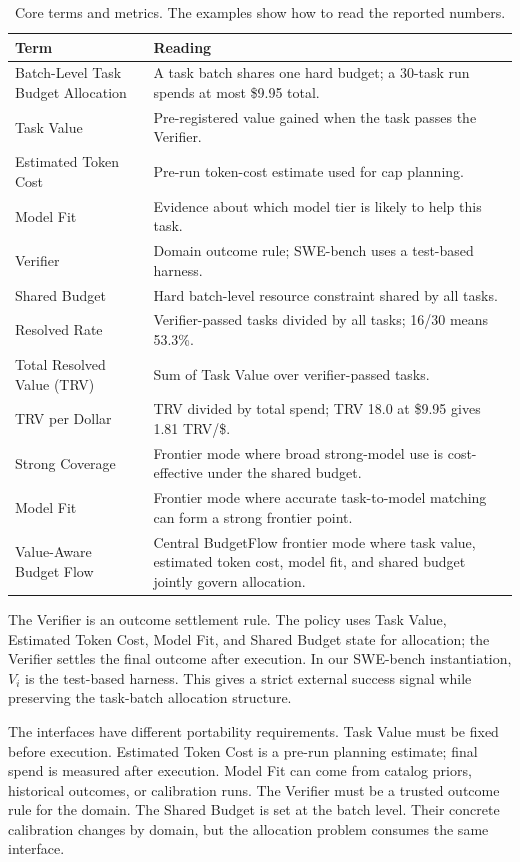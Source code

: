 \documentclass[sigconf,review,anonymous]{acmart}
\newcommand{\method}{BudgetFlow\xspace}
\newcommand{\trv}{TRV\xspace}
\newcommand{\taskvalue}{Task Value\xspace}
\newcommand{\tokencost}{Estimated Token Cost\xspace}
\newcommand{\modelfit}{Model Fit\xspace}
\newcommand{\sharedbudget}{Shared Budget\xspace}
\newcommand{\verifier}{Verifier\xspace}
\begin{document}
\begin{table}[t]
\centering
\footnotesize
\begin{tabular}{@{}p{}p{}@{}}
\toprule
Term & Reading \\
\midrule
Batch-Level Task Budget Allocation & A task batch shares one hard budget; a 30-task run spends at most \$9.95 total. \\
\taskvalue & Pre-registered value gained when the task passes the \verifier. \\
\tokencost & Pre-run token-cost estimate used for cap planning. \\
\modelfit & Evidence about which model tier is likely to help this task. \\
\verifier & Domain outcome rule; SWE-bench uses a test-based harness. \\
\sharedbudget & Hard batch-level resource constraint shared by all tasks. \\
Resolved Rate & Verifier-passed tasks divided by all tasks; 16/30 means 53.3\%. \\
Total Resolved Value (\trv) & Sum of \taskvalue over verifier-passed tasks. \\
\trv per Dollar & \trv divided by total spend; \trv 18.0 at \$9.95 gives 1.81 \trv/\$. \\
Strong Coverage & Frontier mode where broad strong-model use is cost-effective under the shared budget. \\
Model Fit & Frontier mode where accurate task-to-model matching can form a strong frontier point. \\
Value-Aware Budget Flow & Central \method frontier mode where task value, estimated token cost, model fit, and shared budget jointly govern allocation. \\
\bottomrule
\end{tabular}
\caption{Core terms and metrics. The examples show how to read the reported numbers.}
\label{tab:glossary}
\end{table}

The \verifier is an outcome settlement rule. The policy uses \taskvalue, \tokencost, \modelfit, and \sharedbudget state for allocation; the \verifier settles the final outcome after execution. In our SWE-bench instantiation, $V_i$ is the test-based harness. This gives a strict external success signal while preserving the task-batch allocation structure.

The interfaces have different portability requirements. \taskvalue must be fixed before execution. \tokencost is a pre-run planning estimate; final spend is measured after execution. \modelfit can come from catalog priors, historical outcomes, or calibration runs. The \verifier must be a trusted outcome rule for the domain. The \sharedbudget is set at the batch level. Their concrete calibration changes by domain, but the allocation problem consumes the same interface.
\end{document}
